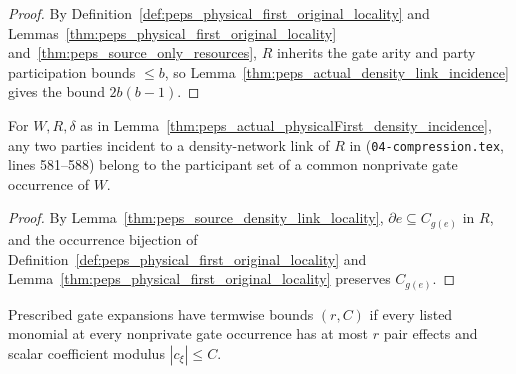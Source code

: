 \begin{proof}
    \leanok
    By Definition~\ref{def:peps_physical_first_original_locality} and
    Lemmas~\ref{thm:peps_physical_first_original_locality}
    and~\ref{thm:peps_source_only_resources},
    $R$ inherits the gate arity and party participation bounds $\le b$, so
    Lemma~\ref{thm:peps_actual_density_link_incidence} gives the bound
    $2b(b-1)$.
\end{proof}

\begin{lemma}
    \label{thm:peps_actual_physicalFirst_density_locality}
    \leanok
    For $W,R,\delta$ as in Lemma~\ref{thm:peps_actual_physicalFirst_density_incidence},
    any two parties incident to a density-network link of $R$ in
    \cite[proof of Theorem~5.2]{OpenAI2026PolynomialPEPS}
    (\texttt{04-compression.tex}, lines 581--588) belong to the participant set
    of a common nonprivate gate occurrence of $W$.
\end{lemma}

\begin{proof}
    \leanok
    By Lemma~\ref{thm:peps_source_density_link_locality}, $\partial e\subseteq C_{g(e)}$
    in $R$, and the occurrence bijection of
    Definition~\ref{def:peps_physical_first_original_locality} and
    Lemma~\ref{thm:peps_physical_first_original_locality} preserves $C_{g(e)}$.
\end{proof}

\begin{definition}
    \label{def:peps_effect_termwise_bounds}
    \leanok
    Prescribed gate expansions have termwise bounds $(r,C)$ if every listed
    monomial at every nonprivate gate occurrence has at most $r$ pair effects
    and scalar coefficient modulus $|c_\xi|\le C$.
\end{definition}

